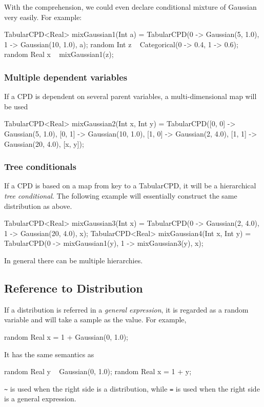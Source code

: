 \documentclass[12pt]{article}
\begin{document}
With the comprehension, we could even declare conditional mixture of Gaussian very easily. For example:
\begin{blog}
TabularCPD<Real> mixGaussian1(Int a) = 
    TabularCPD({0 -> Gaussian(5, 1.0), 1 -> Gaussian(10, 1.0)}, a);
random Int z ~ Categorical({0 -> 0.4, 1 -> 0.6});
random Real x ~ mixGaussian1(z);
\end{blog}

\subsubsection{Multiple dependent variables}
If a CPD is dependent on several parent variables, a multi-dimensional map will be used
\begin{blog}
TabularCPD<Real> mixGaussian2(Int x, Int y) = 
    TabularCPD({[0, 0] -> Gaussian(5, 1.0), 
                [0, 1] -> Gaussian(10, 1.0),
                [1, 0] -> Gaussian(2, 4.0),
                [1, 1] -> Gaussian(20, 4.0)}, [x, y]);
\end{blog}


\subsubsection{Tree conditionals}
If a CPD is based on a map from key to a TabularCPD, it will be a hierarchical \emph{tree conditional}. 
The following example will essentially construct the same distribution as above.
\begin{blog}
TabularCPD<Real> mixGaussian3(Int x) = 
    TabularCPD({0 -> Gaussian(2, 4.0), 1 -> Gaussian(20, 4.0)}, x);
TabularCPD<Real> mixGaussian4(Int x, Int y) = 
    TabularCPD({0 -> mixGaussian1(y), 1 -> mixGaussian3(y)}, x);
\end{blog}
In general there can be multiple hierarchies.



\subsection{Reference to Distribution}
If a distribution is referred in a \emph{general expression}, it is regarded as a random variable and will take a sample as the value.
For example, 
\begin{blog}
random Real x = 1 + Gaussian(0, 1.0);
\end{blog}
It has the same semantics as
\begin{blog}
random Real y ~ Gaussian(0, 1.0);
random Real x = 1 + y;
\end{blog}
\texttt{\~{}} is used when the right side is a distribution, while \texttt{=} is used when the right side is a general expression. 
\end{document}
